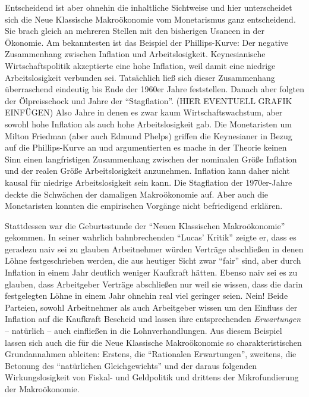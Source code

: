 Entscheidend ist aber ohnehin die inhaltliche Sichtweise und hier unterscheidet sich die Neue Klassische Makroökonomie vom Monetarismus ganz entscheidend. Sie brach gleich an mehreren Stellen mit den bisherigen Usancen in der Ökonomie. Am bekanntesten ist das Beispiel der Phillips-Kurve: Der negative Zusammenhang zwischen Inflation und Arbeitslosigkeit. Keynesianische Wirtschaftspolitik akzeptierte eine hohe Inflation, weil damit eine niedrige Arbeitslosigkeit verbunden sei. Tatsächlich ließ sich dieser Zusammenhang überraschend eindeutig bis Ende der 1960er Jahre feststellen. Danach aber folgten der Ölpreisschock und Jahre der "`Stagflation"'. (HIER EVENTUELL GRAFIK EINFÜGEN) Also Jahre in denen es zwar kaum Wirtschaftswachstum, aber sowohl hohe Inflation als auch hohe Arbeitslosigkeit gab. Die Monetaristen um Milton Friedman (aber auch Edmund Phelps) griffen die Keynesianer in Bezug auf die Phillips-Kurve an und argumentierten es mache in der Theorie keinen Sinn einen langfristigen Zusammenhang zwischen der nominalen Größe Inflation und der realen Größe Arbeitslosigkeit anzunehmen. Inflation kann daher nicht kausal für niedrige Arbeitslosigkeit sein kann. Die Stagflation der 1970er-Jahre deckte die Schwächen der damaligen Makroökonomie auf. Aber auch die Monetaristen konnten die empirischen Vorgänge nicht befriedigend erklären.

Stattdessen war die Geburtsstunde der "`Neuen Klassischen Makroökonomie"' gekommen. In seiner wahrlich bahnbrechenden "`Lucas' Kritik"' \parencite[S. 19ff]{Lucas1976} zeigte er, dass es geradezu naiv sei zu glauben Arbeitnehmer würden Verträge abschließen in denen Löhne festgeschrieben werden, die aus heutiger Sicht zwar "`fair"' sind, aber durch Inflation in einem Jahr deutlich weniger Kaufkraft hätten. Ebenso naiv sei es zu glauben, dass Arbeitgeber Verträge abschließen nur weil sie wissen, dass die darin festgelegten Löhne in einem Jahr ohnehin real viel geringer seien. Nein! Beide Parteien, sowohl Arbeitnehmer als auch Arbeitgeber wissen um den Einfluss der Inflation auf die Kaufkraft Bescheid und lassen ihre entsprechenden \textit{Erwartungen} -- natürlich -- auch einfließen in die Lohnverhandlungen. Aus diesem Beispiel lassen sich auch die für die Neue Klassische Makroökonomie so charakteristischen Grundannahmen ableiten: Erstens, die "`Rationalen Erwartungen"', zweitens, die Betonung des "`natürlichen Gleichgewichts"' und der daraus folgenden Wirkungslosigkeit von Fiskal- und Geldpolitik und drittens der Mikrofundierung der Makroökonomie.

